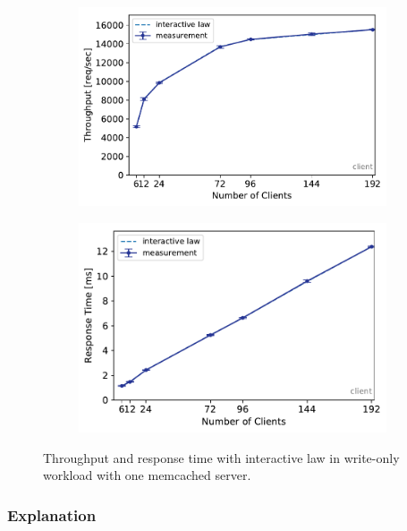 \documentclass[11pt,a4paper]{article}
\begin{document}
\begin{figure}
	\begin{subfigure}[b]{.49\linewidth}
		\centering
		\includegraphics[width=\linewidth]{data/exp21_wo_tp_nc.pdf}
	\end{subfigure}\hfill
	\begin{subfigure}[b]{.49\linewidth}
		\centering
		\includegraphics[width=\linewidth]{data/exp21_wo_rt_nc.pdf}
	\end{subfigure}%
	\caption{Throughput and response time with interactive law in write-only workload with one memcached server.}
	\label{exp21_wo_nc}
\end{figure}



\subsubsection{Explanation}
\end{document}
